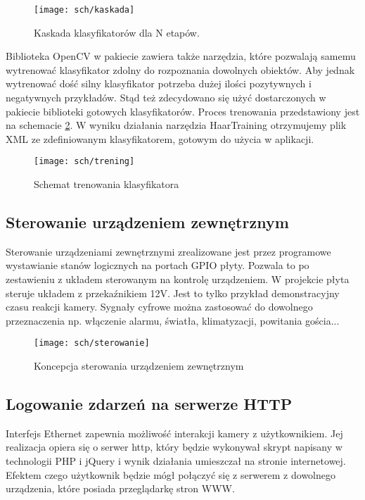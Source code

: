 \begin{figure}[bth]
\centering
{\texttt{[image: sch/kaskada]}}
\caption[Kaskada klasyfikatorów dla N etapów.]{Kaskada klasyfikatorów dla N etapów.}
\label{fig:kaskada}
\end{figure}

Biblioteka OpenCV w pakiecie zawiera także narzędzia, które pozwalają samemu wytrenować klasyfikator zdolny do rozpoznania dowolnych obiektów. Aby jednak wytrenować dość silny klasyfikator potrzeba dużej ilości pozytywnych i negatywnych przykładów. Stąd też zdecydowano się użyć dostarczonych w pakiecie biblioteki gotowych klasyfikatorów. Proces trenowania przedstawiony jest na schemacie \ref{fig:trening}. W wyniku działania narzędzia HaarTraining otrzymujemy plik XML ze zdefiniowanym klasyfikatorem, gotowym do użycia w aplikacji.

\begin{figure}[bth]
\centering
{\texttt{[image: sch/trening]}}
\caption[Schemat trenowania klasyfikatora]{Schemat trenowania klasyfikatora}
\label{fig:trening}
\end{figure}

\subsection{ Sterowanie urządzeniem zewnętrznym}
Sterowanie urządzeniami zewnętrznymi zrealizowane jest przez programowe wystawianie stanów logicznych na portach GPIO płyty. Pozwala to po zestawieniu z układem sterowanym na kontrolę urządzeniem. W projekcie płyta steruje układem z przekaźnikiem 12V. Jest to tylko przykład demonstracyjny czasu reakcji kamery. Sygnały cyfrowe można zastosować do dowolnego przeznaczenia np. włączenie alarmu, światła, klimatyzacji, powitania gościa...

 \begin{figure}[bth]
\centering
{\texttt{[image: sch/sterowanie]}}
\caption[Koncepcja sterowania urządzeniem zewnętrznym]{Koncepcja sterowania urządzeniem zewnętrznym}
\label{fig:sterownie}
\end{figure}

\subsection{ Logowanie zdarzeń na serwerze HTTP}
Interfejs Ethernet zapewnia możliwość interakcji kamery z użytkownikiem.  Jej realizacja opiera się o serwer http, który  będzie wykonywał  skrypt napisany w technologii PHP i jQuery i wynik działania umieszczał na stronie internetowej.
Efektem czego użytkownik będzie mógł połączyć się z serwerem z dowolnego urządzenia, które posiada przeglądarkę stron WWW.  

